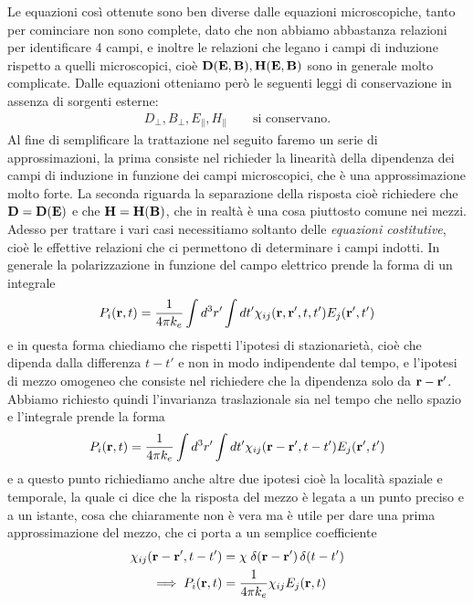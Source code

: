 Le equazioni così ottenute sono ben diverse dalle equazioni microscopiche, tanto per cominciare non sono complete, dato che non abbiamo abbastanza relazioni 
per identificare 4 campi, e inoltre le relazioni che legano i campi di induzione rispetto a quelli microscopici, cioè $ \mathbf{D}(\mathbf{E,B}), \mathbf{H}(\mathbf{E,B}) $ 
sono in generale molto complicate. Dalle equazioni otteniamo però le seguenti leggi di conservazione in assenza di sorgenti esterne:
\begin{align*}
  D_\perp, B_\perp, E_\parallel, H_\parallel \qquad \text{si conservano.}
\end{align*}
Al fine di semplificare la trattazione nel seguito faremo un serie di approssimazioni, la prima consiste nel richieder la linearità della dipendenza dei 
campi di induzione in funzione dei campi microscopici, che è una approssimazione molto forte. La seconda riguarda la separazione della risposta cioè 
richiedere che $ \mathbf{D} = \mathbf{D}(\mathbf{E}) $ e che $ \mathbf{H} = \mathbf{H}(\mathbf{B}) $, che in realtà è una cosa piuttosto comune nei mezzi. Adesso per trattare i vari casi 
necessitiamo soltanto delle \textit{equazioni costitutive}, cioè le effettive relazioni che ci permettono di determinare i campi indotti. In generale 
la polarizzazione in funzione del campo elettrico prende la forma di un integrale 
\begin{align}
  P_i (\mathbf{r},t) = \frac1{4\pi k_e} \int d^3r' \int dt' \chi_{i j}(\mathbf{r, r'}, t, t') E_j (\mathbf{r'}, t')
\end{align}
e in questa forma chiediamo che rispetti l'ipotesi di stazionarietà, cioè che dipenda dalla differenza $ t - t' $ e non in modo indipendente dal tempo, e 
l'ipotesi di mezzo omogeneo che consiste nel richiedere che la dipendenza solo da $ \mathbf{r - r'} $. Abbiamo richiesto quindi l'invarianza traslazionale sia 
nel tempo che nello spazio e l'integrale prende la forma
\begin{align}
  P_i (\mathbf{r},t) = \frac1{4\pi k_e} \int d^3r' \int dt' \chi_{i j}(\mathbf{r - r'}, t - t') E_j (\mathbf{r'}, t')
\end{align}
e a questo punto richiediamo anche altre due ipotesi cioè la località spaziale e temporale, la quale ci dice che la risposta del mezzo è legata a un punto 
preciso e a un istante, cosa che chiaramente non è vera ma è utile per dare una prima approssimazione del mezzo, che ci porta a un semplice coefficiente
\begin{align}
  \chi_{i j}(\mathbf{r - r'}, t- t') &= \chi \; \delta( \mathbf{r - r'}) \, \delta(t - t')
  \\
  \implies P_i (\mathbf{r},t) &= \frac1{4\pi k_e} \chi_{i j} E_j (\mathbf{r}, t)
\end{align}
